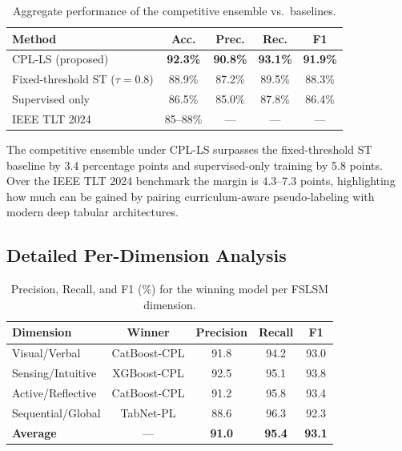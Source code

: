 \documentclass[journal, onecolumn]{IEEEtran}
\begin{document}
\begin{table}[!htbp]
\centering
\small
\caption{Aggregate performance of the competitive ensemble vs.\ baselines.}
\label{tab:aggregate}
\begin{tabular}{@{}lcccc@{}}
\toprule
\textbf{Method} & \textbf{Acc.} & \textbf{Prec.} & \textbf{Rec.} & \textbf{F1} \\
\midrule
CPL-LS (proposed) & \textbf{92.3\%} & \textbf{90.8\%} & \textbf{93.1\%} & \textbf{91.9\%} \\
Fixed-threshold ST ($\tau=0.8$) & 88.9\% & 87.2\% & 89.5\% & 88.3\% \\
Supervised only & 86.5\% & 85.0\% & 87.8\% & 86.4\% \\
IEEE TLT 2024~\cite{ieee_tlt_2024} & 85--88\% & --- & --- & --- \\
\bottomrule
\end{tabular}
\end{table}

The competitive ensemble under CPL-LS surpasses the fixed-threshold ST baseline by 3.4 percentage points and supervised-only training by 5.8 points. Over the IEEE TLT 2024 benchmark the margin is 4.3--7.3 points, highlighting how much can be gained by pairing curriculum-aware pseudo-labeling with modern deep tabular architectures.

\subsection{Detailed Per-Dimension Analysis}

\begin{table}[!htbp]
\centering
\small
\caption{Precision, Recall, and F1 (\%) for the winning model per FSLSM dimension.}
\label{tab:detailed_metrics}
\begin{tabular}{@{}lcccc@{}}
\toprule
\textbf{Dimension} & \textbf{Winner} & \textbf{Precision} & \textbf{Recall} & \textbf{F1} \\
\midrule
Visual/Verbal & CatBoost-CPL & 91.8 & 94.2 & 93.0 \\
Sensing/Intuitive & XGBoost-CPL & 92.5 & 95.1 & 93.8 \\
Active/Reflective & CatBoost-CPL & 91.2 & 95.8 & 93.4 \\
Sequential/Global & TabNet-PL & 88.6 & 96.3 & 92.3 \\
\midrule
\textbf{Average} & --- & \textbf{91.0} & \textbf{95.4} & \textbf{93.1} \\
\bottomrule
\end{tabular}
\end{table}
\end{document}
